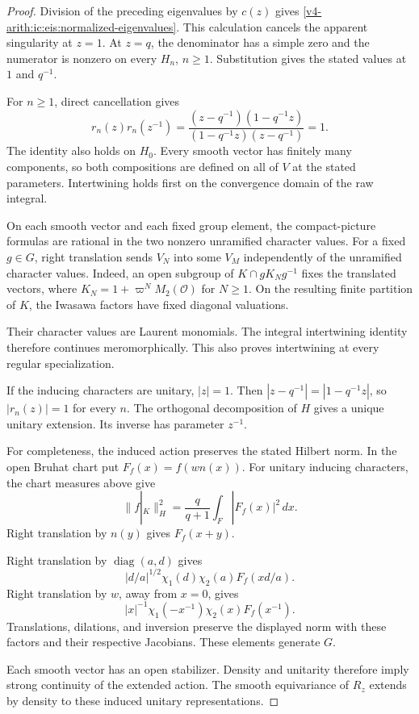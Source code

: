 \begin{proof}
Division of the preceding eigenvalues by $c(z)$ gives
\eqref{v4-arith:ic:eis:normalized-eigenvalues}.
This calculation cancels the apparent singularity at $z=1$.
At $z=q$, the denominator has a simple zero and the numerator is nonzero
on every $H_n$, $n\ge1$.
Substitution gives the stated values at $1$ and $q^{-1}$.

For $n\ge1$, direct cancellation gives
\[
 r_n(z)r_n(z^{-1})
 =\frac{(z-q^{-1})(1-q^{-1}z)}
 {(1-q^{-1}z)(z-q^{-1})}=1.
\]
The identity also holds on $H_0$.
Every smooth vector has finitely many components, so both compositions
are defined on all of $V$ at the stated parameters.
Intertwining holds first on the convergence domain of the raw integral.

On each smooth vector and each fixed group element, the compact-picture
formulas are rational in the two nonzero unramified character values.
For a fixed $g\in G$, right translation sends $V_N$ into some $V_M$
independently of the unramified character values.
Indeed, an open subgroup of $K\cap gK_Ng^{-1}$ fixes the translated
vectors, where $K_N=1+\varpi^NM_2(\mathcal O)$ for $N\ge1$.
On the resulting finite partition of $K$, the Iwasawa factors have
fixed diagonal valuations.

Their character values are Laurent monomials.
The integral intertwining identity therefore continues meromorphically.
This also proves intertwining at every regular specialization.

If the inducing characters are unitary, $|z|=1$.
Then $|z-q^{-1}|=|1-q^{-1}z|$, so $|r_n(z)|=1$ for every $n$.
The orthogonal decomposition of $H$ gives a unique unitary extension.
Its inverse has parameter $z^{-1}$.

For completeness, the induced action preserves the stated Hilbert norm.
In the open Bruhat chart put $F_f(x)=f(wn(x))$.
For unitary inducing characters, the chart measures above give
\[
 \|f|_K\|_H^2=\frac{q}{q+1}\int_F|F_f(x)|^2\,dx.
\]
Right translation by $n(y)$ gives $F_f(x+y)$.

Right translation by $\operatorname{diag}(a,d)$ gives
\[
 |d/a|^{1/2}\chi_1(d)\chi_2(a)F_f(xd/a).
\]
Right translation by $w$, away from $x=0$, gives
\[
 |x|^{-1}\chi_1(-x^{-1})\chi_2(x)F_f(x^{-1}).
\]
Translations, dilations, and inversion preserve the displayed norm
with these factors and their respective Jacobians.
These elements generate $G$.

Each smooth vector has an open stabilizer. Density and unitarity
therefore imply strong continuity of the extended action.
The smooth equivariance of $R_z$ extends by density to these
induced unitary representations.
\end{proof}

